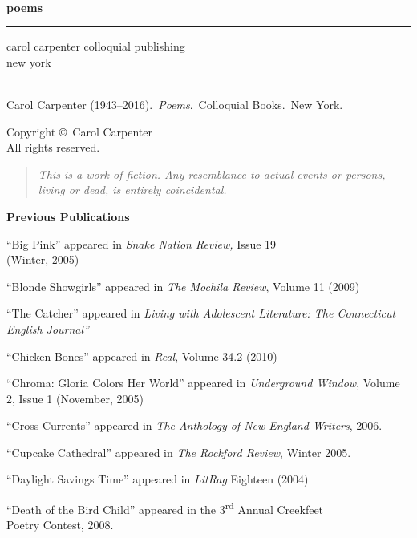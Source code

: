 \documentclass[twoside,10pt]{book}
\author{}
\date{}
\begin{document}
\pagestyle{empty}
\cleardoublepage
\mbox{ }
\cleardoublepage
\frontmatter
\begin{center}
  \vspace*{48pt}
  \hfill {\fontsize{86}{52}\sffamily\bfseries poems}
  \\[12pt]
  \hrule height 1pt
  \hfill {\fontsize{24}{52}\sffamily carol carpenter}
  \vfill
  \hfill {\sffamily colloquial publishing}
  \\
  \hfill {\sffamily new york}
\end{center}
\color{black} %

\clearpage
\mbox{}
\\[36pt]
Carol Carpenter (1943--2016).~\textit{Poems}.~Colloquial Books.~New
York. 
\\[12pt]
\begin{center}
Copyright \copyright\, Carol Carpenter
\\[4pt]
All rights reserved.
\end{center}
\vfill
\begin{quote}
\emph{This is a work of fiction. Any resemblance to actual events or
persons, living or dead, is entirely coincidental.}
\end{quote}
\vfill
\vfill
\null

\clearpage
\pagestyle{fancy}
\noindent
{\Large\bf Previous Publications}

``Big Pink'' appeared in \emph{Snake Nation Review,} Issue 19\\
(Winter, 2005)

``Blonde Showgirls'' appeared in \emph{The Mochila Review}, Volume 11
(2009)

``The Catcher'' appeared in \emph{Living with Adolescent Literature: The
Connecticut English Journal''}

``Chicken Bones'' appeared in \emph{Real}, Volume 34.2 (2010)

``Chroma: Gloria Colors Her World'' appeared in \emph{Underground
Window}, Volume 2, Issue 1 (November, 2005)

``Cross Currents'' appeared in \emph{The Anthology of New England
Writers}, 2006.

``Cupcake Cathedral'' appeared in \emph{The Rockford Review}, Winter
2005.

``Daylight Savings Time'' appeared in \emph{LitRag} Eighteen (2004)

``Death of the Bird Child'' appeared in the 3\textsuperscript{rd} Annual
Creekfeet\\
Poetry Contest, 2008.
\end{document}
